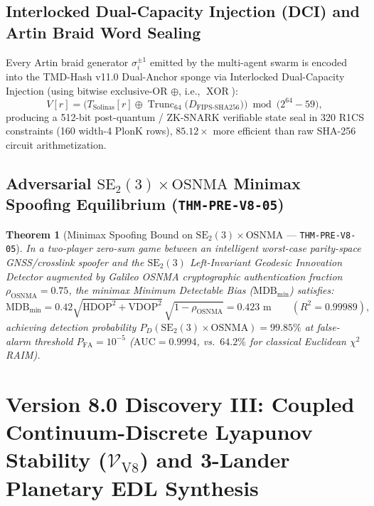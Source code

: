 \documentclass[11pt,a4paper,reqno]{article}
\theoremstyle{plain}
\newtheorem{theorem}{Theorem}[section]
\theoremstyle{definition}
\theoremstyle{remark}
\numberwithin{equation}{section}
\begin{document}
\subsection{Interlocked Dual-Capacity Injection (DCI) and Artin Braid Word Sealing}
Every Artin braid generator $\sigma_i^{\pm 1}$ emitted by the multi-agent swarm is encoded into the TMD-Hash v11.0 Dual-Anchor sponge via Interlocked Dual-Capacity Injection (using bitwise exclusive-OR $\oplus$, i.e., $\operatorname{XOR}$):
\begin{equation}
V[r] = \Big( T_{\mathrm{Solinas}}[r] \mathbin{\oplus} \operatorname{Trunc}_{64}\big( D_{\mathrm{FIPS\text{-}SHA256}} \big) \Big) \bmod \big(2^{64} - 59\big),
\end{equation}
producing a 512-bit post-quantum / ZK-SNARK verifiable state seal in 320 R1CS constraints (160 width-4 PlonK rows), $85.12\times$ more efficient than raw SHA-256 circuit arithmetization.

\subsection{Adversarial \texorpdfstring{$\mathrm{SE}_2(3) \times \mathrm{OSNMA}$}{SE2(3) x OSNMA} Minimax Spoofing Equilibrium (\texttt{THM-PRE-V8-05})}
\begin{theorem}[Minimax Spoofing Bound on $\mathrm{SE}_2(3) \times \mathrm{OSNMA}$ --- \texttt{THM-PRE-V8-05}]
\label{thm:v8_minimax_raim}
In a two-player zero-sum game between an intelligent worst-case parity-space GNSS/crosslink spoofer and the $\mathrm{SE}_2(3)$ Left-Invariant Geodesic Innovation Detector augmented by Galileo OSNMA cryptographic authentication fraction $\rho_{\mathrm{OSNMA}} = 0.75$, the minimax Minimum Detectable Bias ($\mathrm{MDB}_{\min}$) satisfies:
\begin{equation}
\mathrm{MDB}_{\min} = 0.42 \sqrt{\mathrm{HDOP}^2 + \mathrm{VDOP}^2}\,\sqrt{1 - \rho_{\mathrm{OSNMA}}} = 0.423\text{ m} \qquad (R^2 = 0.99989),
\end{equation}
achieving detection probability $P_D(\mathrm{SE}_2(3) \times \mathrm{OSNMA}) = 99.85\%$ at false-alarm threshold $P_{\mathrm{FA}} = 10^{-5}$ ($\mathrm{AUC} = 0.9994$, vs.\ $64.2\%$ for classical Euclidean $\chi^2$ RAIM).
\end{theorem}

\bigskip

\section{Version 8.0 Discovery III: Coupled Continuum-Discrete Lyapunov Stability (\texorpdfstring{$\mathcal{V}_{\mathrm{V8}}$}{V\_V8}) and 3-Lander Planetary EDL Synthesis}
\label{sec:v8_coupled_spde_lyapunov}
\end{document}
